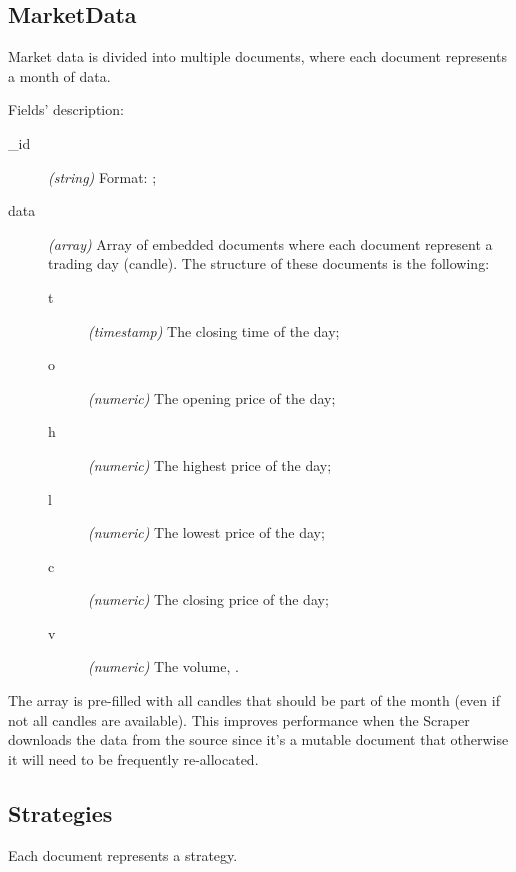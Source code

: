 \subsection{MarketData}

Market data is divided into multiple documents, where each document represents a
month of data.



Fields' description:
\begin{description}
	\item[\_id] \textit{(string)} Format:
		;
	\item[data] \textit{(array)} Array of embedded documents where each
		document represent a trading day (candle). The structure of
		these documents is the following:
		\begin{description}
			\item[t] \textit{(timestamp)} The closing time of the
				day;
			\item[o] \textit{(numeric)} The opening price of the
				day;
			\item[h] \textit{(numeric)} The highest price of the
				day;
			\item[l] \textit{(numeric)} The lowest price of the day;
			\item[c] \textit{(numeric)} The closing price of the
				day;
			\item[v] \textit{(numeric)} The volume, .
		\end{description}
\end{description}

The  array is pre-filled with all candles that should be part of the
month (even if not all candles are available). This improves performance when
the Scraper downloads the data from the source since it's a mutable document
that otherwise it will need to be frequently re-allocated.

\subsection{Strategies}

Each document represents a strategy.



